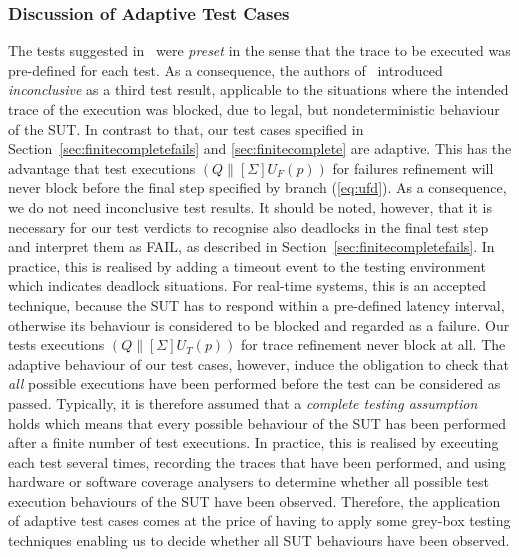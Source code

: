 \subsubsection*{Discussion of Adaptive Test Cases}
The tests suggested
in~\cite{Hennessy:1988:ATP:50497,DBLP:conf/icfem/CavalcantiG07} were \emph{preset} in the
sense that the trace to be executed was pre-defined for each test. As a consequence,
the authors of~\cite{DBLP:conf/icfem/CavalcantiG07} introduced \emph{inconclusive}
as a third test result, applicable to the situations where the intended trace
of the execution was blocked, due to legal, but nondeterministic behaviour of the
SUT. In contrast to that,
our test cases
specified in Section~\ref{sec:finitecompletefails} and \ref{sec:finitecomplete} are
adaptive. This has the advantage that test executions $(Q\parallel[\Sigma] U_F(p))$
for failures refinement
will never block before the final step specified by branch (\ref{eq:ufd}). As
a consequence, we do not need inconclusive test results. It should be noted, however,
that it is necessary for our test verdicts to recognise also deadlocks in the final
test step and interpret
them as FAIL, as described in Section~\ref{sec:finitecompletefails}. In practice,
this is realised by adding a timeout event to the testing environment which indicates
deadlock situations. For real-time systems, this is an accepted technique, because
the SUT has to respond within a pre-defined latency interval, otherwise its behaviour
is considered to be blocked and regarded as a failure. Our tests executions
$(Q\parallel[\Sigma] U_T(p))$ for trace refinement never block at all. The adaptive
behaviour of our test cases, however, induce the obligation to check that {\it all}
possible executions have been performed before the test can be considered as passed.
Typically, it is therefore assumed that a
\emph{complete testing assumption}~\cite{hierons_testing_2004} holds which means that
every possible behaviour of the SUT has been performed after a finite number of
test executions.
In practice, this is realised by executing each test several times,
recording the traces that have been performed, and using hardware or software coverage
analysers to determine whether all possible test execution behaviours of the SUT
have been observed. Therefore, the application of adaptive test cases comes at the price
of having to apply some grey-box testing techniques enabling us to decide whether
all SUT behaviours have been observed.


